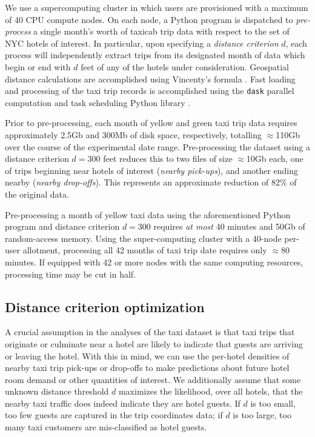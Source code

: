 \documentclass[useAMS, usenatbib]{biom}
\begin{document}
We use a supercomputing cluster in which users are provisioned with a maximum of 40 CPU compute nodes. On each node, a Python program is dispatched to \textit{pre-process} a single month's worth of taxicab trip data with respect to the set of NYC hotels of interest. In particular, upon specifying a \textit{distance criterion} $d$, each process will independently extract trips from its designated month of data which begin or end with $d$ feet of any of the hotels under consideration. Geospatial distance calculations are accomplished using Vincenty's formula \citep{bessel_calculation_2010}. Fast loading and processing of the taxi trip records is accomplished using the \texttt{dask} parallel computation and task scheduling Python library \citep{dask}.

Prior to pre-processing, each month of yellow and green taxi trip data requires approximately 2.5Gb and 300Mb of disk space, respectively, totalling $\approx$110Gb over the course of the experimental date range. Pre-processing the dataset using a distance criterion $d = 300$ feet reduces this to two files of size $\approx$10Gb each, one of trips beginning near hotels of interest (\textit{nearby pick-ups}), and another ending nearby (\textit{nearby drop-offs}). This represents an approximate reduction of 82\% of the original data.

Pre-processing a month of yellow taxi data using the aforementioned Python program and distance criterion $d = 300$ requires \textit{at most} 40 minutes and 50Gb of random-access memory. Using the super-computing cluster with a 40-node per-user allotment, processing all 42 months of taxi trip date requires only $\approx$80 minutes. If equipped with 42 or more nodes with the same computing resources, processing time may be cut in half.

\subsection{Distance criterion optimization}

A crucial assumption in the analyses of the taxi dataset is that taxi trips that originate or culminate near a hotel are likely to indicate that guests are arriving or leaving the hotel. With this in mind, we can use the per-hotel densities of nearby taxi trip pick-ups or drop-offs to make predictions about future hotel room demand or other quantities of interest. We additionally assume that some unknown distance threshold $d$ maximizes the likelihood, over all hotels, that the nearby taxi traffic does indeed indicate they are hotel guests. If $d$ is too small, too few guests are captured in the trip coordinates data; if $d$ is too large, too many taxi customers are mis-classified as hotel guests.
\end{document}
